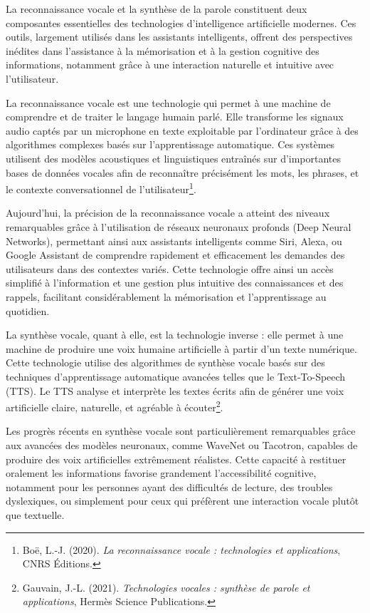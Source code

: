 \documentclass[12pt,a4paper]{report}
\begin{document}
La reconnaissance vocale et la synthèse de la parole constituent deux composantes essentielles des technologies d’intelligence artificielle modernes. Ces outils, largement utilisés dans les assistants intelligents, offrent des perspectives inédites dans l’assistance à la mémorisation et à la gestion cognitive des informations, notamment grâce à une interaction naturelle et intuitive avec l’utilisateur.

La reconnaissance vocale est une technologie qui permet à une machine de comprendre et de traiter le langage humain parlé. Elle transforme les signaux audio captés par un microphone en texte exploitable par l’ordinateur grâce à des algorithmes complexes basés sur l’apprentissage automatique. Ces systèmes utilisent des modèles acoustiques et linguistiques entraînés sur d’importantes bases de données vocales afin de reconnaître précisément les mots, les phrases, et le contexte conversationnel de l’utilisateur\footnote{Boë, L.-J. (2020). \textit{La reconnaissance vocale : technologies et applications}, CNRS Éditions.}.

Aujourd’hui, la précision de la reconnaissance vocale a atteint des niveaux remarquables grâce à l’utilisation de réseaux neuronaux profonds (Deep Neural Networks), permettant ainsi aux assistants intelligents comme Siri, Alexa, ou Google Assistant de comprendre rapidement et efficacement les demandes des utilisateurs dans des contextes variés. Cette technologie offre ainsi un accès simplifié à l’information et une gestion plus intuitive des connaissances et des rappels, facilitant considérablement la mémorisation et l’apprentissage au quotidien.

La synthèse vocale, quant à elle, est la technologie inverse : elle permet à une machine de produire une voix humaine artificielle à partir d’un texte numérique. Cette technologie utilise des algorithmes de synthèse vocale basés sur des techniques d’apprentissage automatique avancées telles que le Text-To-Speech (TTS). Le TTS analyse et interprète les textes écrits afin de générer une voix artificielle claire, naturelle, et agréable à écouter\footnote{Gauvain, J.-L. (2021). \textit{Technologies vocales : synthèse de parole et applications}, Hermès Science Publications.}.

Les progrès récents en synthèse vocale sont particulièrement remarquables grâce aux avancées des modèles neuronaux, comme WaveNet ou Tacotron, capables de produire des voix artificielles extrêmement réalistes. Cette capacité à restituer oralement les informations favorise grandement l’accessibilité cognitive, notamment pour les personnes ayant des difficultés de lecture, des troubles dyslexiques, ou simplement pour ceux qui préfèrent une interaction vocale plutôt que textuelle.
\end{document}
